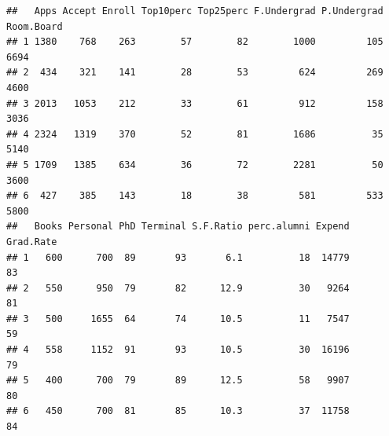 \documentclass[
]{article}
\newenvironment{Shaded}{\begin{snugshade}}{\end{snugshade}}
\newcommand{\CommentTok}[1]{\textcolor[rgb]{0.56,0.35,0.01}{\textit{#1}}}
\newcommand{\DecValTok}[1]{\textcolor[rgb]{0.00,0.00,0.81}{#1}}
\newcommand{\FunctionTok}[1]{\textcolor[rgb]{0.13,0.29,0.53}{\textbf{#1}}}
\newcommand{\NormalTok}[1]{#1}
\newcommand{\OtherTok}[1]{\textcolor[rgb]{0.56,0.35,0.01}{#1}}
\newcommand{\SpecialCharTok}[1]{\textcolor[rgb]{0.81,0.36,0.00}{\textbf{#1}}}
\begin{document}
\begin{verbatim}
##   Apps Accept Enroll Top10perc Top25perc F.Undergrad P.Undergrad Room.Board
## 1 1380    768    263        57        82        1000         105       6694
## 2  434    321    141        28        53         624         269       4600
## 3 2013   1053    212        33        61         912         158       3036
## 4 2324   1319    370        52        81        1686          35       5140
## 5 1709   1385    634        36        72        2281          50       3600
## 6  427    385    143        18        38         581         533       5800
##   Books Personal PhD Terminal S.F.Ratio perc.alumni Expend Grad.Rate
## 1   600      700  89       93       6.1          18  14779        83
## 2   550      950  79       82      12.9          30   9264        81
## 3   500     1655  64       74      10.5          11   7547        59
## 4   558     1152  91       93      10.5          30  16196        79
## 5   400      700  79       89      12.5          58   9907        80
## 6   450      700  81       85      10.3          37  11758        84
\end{verbatim}

\begin{Shaded}
\end{Shaded}
\end{document}
